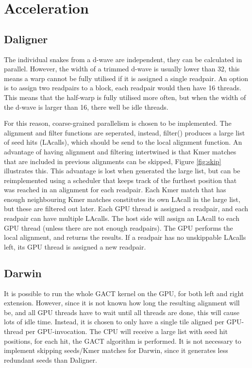 \documentclass[../main/thesis.tex]{subfiles}
\begin{document}
\section{Acceleration}
\subsection{Daligner}
The individual snakes from a d-wave are independent, they can be calculated in parallel.
However, the width of a trimmed d-wave is usually lower than 32, this means a warp cannot be fully utilised if it is assigned a single readpair.
An option is to assign two readpairs to a block, each readpair would then have 16 threads.
This means that the half-warp is fully utilised more often, but when the width of the d-wave is larger than 16, there well be idle threads.

For this reason, coarse-grained parallelism is chosen to be implemented.
The alignment and filter functions are seperated, instead, filter() produces a large list of seed hits (LAcalls), which should be send to the local alignment function.
An advantage of having alignment and filtering intertwined is that Kmer matches that are included in previous alignments can be skipped, Figure \ref{fig:skip} illustrates this.
This advantage is lost when generated the large list, but can be reimplemented using a scheduler that keeps track of the furthest position that was reached in an alignment for each readpair.
Each Kmer match that has enough neighbouring Kmer matches constitutes its own LAcall in the large list, but these are filtered out later.
Each GPU thread is assigned a readpair, and each readpair can have multiple LAcalls.
The host side will assign an LAcall to each GPU thread (unless there are not enough readpairs).
The GPU performs the local alignment, and returns the results.
If a readpair has no unskippable LAcalls left, its GPU thread is assigned a new readpair.






\subsection{Darwin}
It is possible to run the whole GACT kernel on the GPU, for both left and right extension.
However, since it is not known how long the resulting alignment will be, and all GPU threads have to wait until all threads are done, this will cause lots of idle time.
Instead, it is chosen to only have a single tile aligned per GPU-thread per GPU-invocation.
The CPU will receive a large list with seed hit positions, for each hit, the GACT algorithm is performed.
It is not necessary to implement skipping seeds/Kmer matches for Darwin, since it generates less redundant seeds than Daligner.
\end{document}
